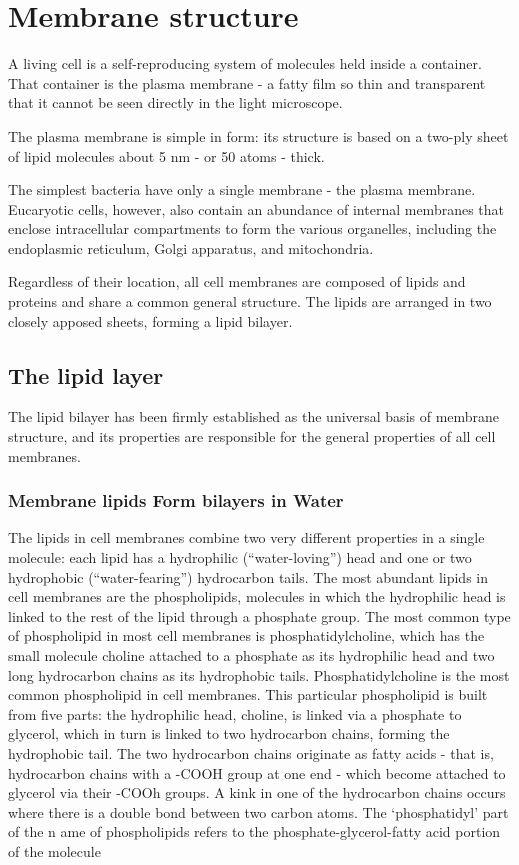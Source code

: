 \chapter{Membrane structure}

A living cell is a self-reproducing system of molecules held inside a container. 
That container is the plasma membrane - a fatty film so thin and
transparent that it cannot be seen directly in the light microscope.

The plasma membrane is simple in form: its structure is based on a two-ply 
sheet of lipid molecules about 5 nm - or 50 atoms - thick.

The simplest bacteria have only a single membrane - the plasma membrane. 
Eucaryotic cells, however, also contain an abundance of internal
membranes that enclose intracellular compartments to form the various
organelles, including the endoplasmic reticulum, Golgi apparatus, and
mitochondria.

Regardless of their location, all cell membranes are composed of lipids
and proteins and share a common general structure. The
lipids are arranged in two closely apposed sheets, forming a lipid bilayer.

\section{The lipid layer}

The lipid bilayer has been firmly established as the universal basis of
membrane structure, and its properties are responsible for the general
properties of all cell membranes.

\subsection{Membrane lipids Form bilayers in Water}

The lipids in cell membranes combine two very different properties in a
single molecule: each lipid has a hydrophilic (“water-loving”) head and
one or two hydrophobic (“water-fearing”) hydrocarbon tails.
The most abundant lipids in cell membranes are the phospholipids,
molecules in which the hydrophilic head is linked to the rest of the lipid
through a phosphate group. The most common type of phospholipid
in most cell membranes is phosphatidylcholine, which has the small
molecule choline attached to a phosphate as its hydrophilic head and two
long hydrocarbon chains as its hydrophobic tails.
Phosphatidylcholine is the most common phospholipid in cell membranes.
This particular phospholipid is built from five parts: the hydrophilic head,
choline, is linked via a phosphate to glycerol, which in turn is linked to two 
hydrocarbon chains, forming the hydrophobic tail. The two hydrocarbon chains originate 
as fatty acids - that is, hydrocarbon chains with a -COOH group at one end - which become 
attached to glycerol via their -COOh groups. A kink in one of the hydrocarbon chains 
occurs where there is a double bond between two carbon atoms. The ‘phosphatidyl’ part of the n
ame of phospholipids refers to the phosphate-glycerol-fatty acid portion of the molecule

